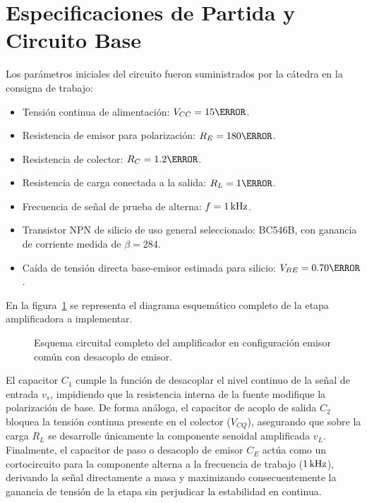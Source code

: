 \section{Especificaciones de Partida y Circuito Base}

Los parámetros iniciales del circuito fueron suministrados por la cátedra en la consigna de trabajo:
\begin{itemize}
  \item Tensión continua de alimentación: $V_{CC} = 15\V$.
  \item Resistencia de emisor para polarización: $R_E = 180\ohm$.
  \item Resistencia de colector: $R_C = 1.2\kohm$.
  \item Resistencia de carga conectada a la salida: $R_L = 1\kohm$.
  \item Frecuencia de señal de prueba de alterna: $f = 1\,\mathrm{kHz}$.
  \item Transistor NPN de silicio de uso general seleccionado: BC546B, con ganancia de corriente medida de $\beta = 284$.
  \item Caída de tensión directa base-emisor estimada para silicio: $V_{BE} = 0.70\V$.
\end{itemize}

En la figura~\ref{crkt:emisor_comun} se representa el diagrama esquemático completo de la etapa amplificadora a implementar.

\begin{figure}[!ht]
  \centering
  
  \caption{Esquema circuital completo del amplificador en configuración emisor común con desacoplo de emisor.}
  \label{crkt:emisor_comun}
\end{figure}

El capacitor $C_1$ cumple la función de desacoplar el nivel continuo de la señal de entrada $v_s$, impidiendo que la
resistencia interna de la fuente modifique la polarización de base. De forma análoga, el capacitor de acoplo de salida
$C_2$ bloquea la tensión continua presente en el colector ($V_{CQ}$), asegurando que sobre la carga $R_L$ se desarrolle
únicamente la componente senoidal amplificada $v_L$. Finalmente, el capacitor de paso o desacoplo de emisor $C_E$ actúa
como un cortocircuito para la componente alterna a la frecuencia de trabajo ($1\,\mathrm{kHz}$), derivando la señal directamente a
masa y maximizando consecuentemente la ganancia de tensión de la etapa sin perjudicar la estabilidad en continua.
